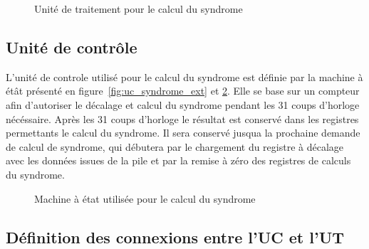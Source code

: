 \documentclass[a4paper, 11pt, svgnames]{report}
\begin{document}
\begin{figure}[H]
\begin{tikzpicture}[>=stealth,scale=0.375, every node/.style={scale=0.5}, circuit logic US]
                \end{tikzpicture}
                \caption{Unité de traitement pour le calcul du syndrome}
                \label{fig:ut_syndrome}
            \end{figure}

            \subsection{Unité de contrôle}
            \label{sec:uc_syndrome}

            L'unité de controle utilisé pour le calcul du syndrome est définie
            par la machine à étât présenté en figure~\ref{fig:uc_syndrome_ext}
            et \ref{fig:me_syndrome}.  Elle se base sur un compteur afin
            d'autoriser le décalage et calcul du syndrome pendant les 31 coups
            d'horloge nécéssaire. Après les 31 coups d'horloge le résultat est
            conservé dans les registres permettants le calcul du syndrome. Il
            sera conservé jusqua la prochaine demande de calcul de syndrome,
            qui débutera par le chargement du registre à décalage avec les
            données issues de la pile et par la remise à zéro des registres de
            calculs du syndrome.

            \begin{figure}[H]
                \caption{Machine à état utilisée pour le calcul du syndrome}
                \label{fig:me_syndrome}
            \end{figure}

            \subsection{Définition des connexions entre l'UC et l'UT}
\end{document}
